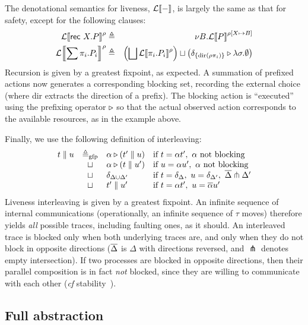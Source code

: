 \documentclass{entcs}
\begin{document}
The denotational semantics for liveness, $\mathcal{L}\!\left\llbracket - \right\rrbracket$, is largely the
same as that for safety, except for the following clauses:
\begin{eqnarray*}
\mathcal{L}\!\left\llbracket \textsf{rec } X.P \right\rrbracket^{\rho}
  &\triangleq&\ \nu B. \mathcal{L}\!\left\llbracket P \right\rrbracket^{\rho[X \mapsto B]} \\
\mathcal{L}\!\left\llbracket \sum \pi_i. P_i \right\rrbracket^{\rho} 
  &\triangleq& \left(\bigsqcup \mathcal{L}\!\left\llbracket \pi_i. P_i \right\rrbracket^{\rho} \right)
    \sqcup \left(\delta_{\{\textrm{dir}(\rho\pi_i)\}} \triangleright \lambda \sigma.\emptyset \right)
\end{eqnarray*}
Recursion is given by a greatest fixpoint, as expected. A summation of
prefixed actions now generates a corresponding blocking set, recording
the external choice (where dir extracts the direction of a prefix).
The blocking action is ``executed'' using the prefixing operator
$\triangleright$ so that the actual observed action corresponds to the
available resources, as in the example above.

Finally, we use the following definition of interleaving:
\[
\begin{array}{rcll}
t \parallel u &\triangleq_{\textrm{gfp}}& 
  \alpha \triangleright (t' \parallel u) 
    &\textrm{if } t = \alpha t',\ \alpha \ \textrm{not blocking} \\&\sqcup&
  \alpha \triangleright (t \parallel u') 
    &\textrm{if } u = \alpha u',\ \alpha \ \textrm{not blocking} \\&\sqcup&
  \delta_{\Delta \cup \Delta'} 
    &\textrm{if } t = \delta_\Delta,\ u = \delta_{\Delta'},\ \overline{\Delta} \pitchfork \Delta' \\&\sqcup&
  t' \parallel u' &\textrm{if } t = \alpha t',\ u = \overline{\alpha} u'
\end{array}
\]
Liveness interleaving is given by a greatest fixpoint.  An infinite
sequence of internal communications (operationally, an infinite
sequence of $\tau$ moves) therefore yields \emph{all} possible traces,
including faulting ones, as it should.  An interleaved trace is
blocked only when both underlying traces are, and only when they do
not block in opposite directions ($\overline{\Delta}$ is $\Delta$ with
directions reversed, and $\pitchfork$ denotes empty intersection).  If
two processes are blocked in opposite directions, then their parallel
composition is in fact \emph{not} blocked, since they are willing to
communicate with each other (\emph{cf} stability~\cite{Brookes1984}).

\subsection{Full abstraction}
\end{document}
